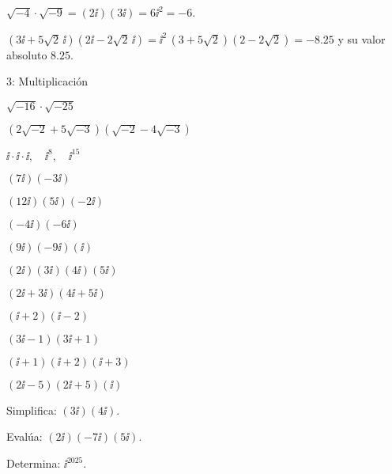 
\begin{ejemplos}
  \item \(\sqrt{-4}\cdot\sqrt{-9}=(2\ii)(3\ii)=6\ii^2=-6\).
  \item \((3\ii+5\sqrt{2}\,\ii)(2\ii-2\sqrt{2}\,\ii)=
        \ii^2\,(3+5\sqrt{2})(2-2\sqrt{2})= -8.25\) y su valor absoluto \(8.25\).
\end{ejemplos}

\begin{actividad}{3: Multiplicación}
  \item \(\sqrt{-16}\cdot\sqrt{-25}\)
  \item \((2\sqrt{-2}+5\sqrt{-3})(\sqrt{-2}-4\sqrt{-3})\)
  \item \(\ii\cdot \ii \cdot \ii,\quad \ii^8,\quad \ii^{15}\)

  \item \((7\ii)(-3\ii)\)
  \item \((12\ii)(5\ii)(-2\ii)\)
  \item \((-4\ii)(-6\ii)\)
  \item \((9\ii)(-9\ii)(\ii)\)
  \item \((2\ii)(3\ii)(4\ii)(5\ii)\)

  \item \((2\ii+3\ii)(4\ii+5\ii)\)
  \item \((\ii+2)(\ii-2)\)
  \item \((3\ii-1)(3\ii+1)\)
  \item \((\ii+1)(\ii+2)(\ii+3)\)
  \item \((2\ii-5)(2\ii+5)(\ii)\)
\end{actividad}

\begin{retos}
  \item Simplifica: \((3\ii)(4\ii)\).
  \item Evalúa: \((2\ii)(-7\ii)(5\ii)\).
  \item Determina: \(\ii^{2025}\).
\end{retos}